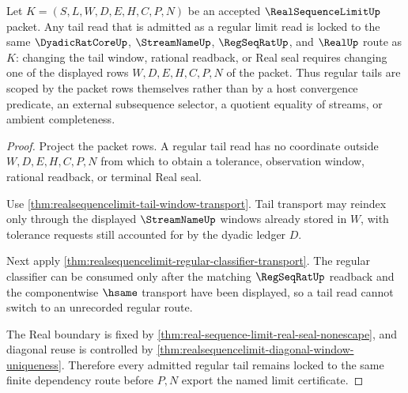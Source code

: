 \begin{theorem}\label{thm:realsequencelimit-regular-tail-scope-lock}
Let $K=(S,L,W,D,E,H,C,P,N)$ be an accepted $\RealSequenceLimitUp$ packet. Any tail read that is admitted as a regular limit read is locked to the same $\DyadicRatCoreUp$, $\StreamNameUp$, $\RegSeqRatUp$, and $\RealUp$ route as $K$: changing the tail window, rational readback, or Real seal requires changing one of the displayed rows $W,D,E,H,C,P,N$ of the packet. Thus regular tails are scoped by the packet rows themselves rather than by a host convergence predicate, an external subsequence selector, a quotient equality of streams, or ambient completeness.
\end{theorem}
\begin{proof}
Project the packet rows. A regular tail read has no coordinate outside $W,D,E,H,C,P,N$ from which to obtain a tolerance, observation window, rational readback, or terminal Real seal.

Use \autoref{thm:realsequencelimit-tail-window-transport}. Tail transport may reindex only through the displayed $\StreamNameUp$ windows already stored in $W$, with tolerance requests still accounted for by the dyadic ledger $D$.

Next apply \autoref{thm:realsequencelimit-regular-classifier-transport}. The regular classifier can be consumed only after the matching $\RegSeqRatUp$ readback and the componentwise $\hsame$ transport have been displayed, so a tail read cannot switch to an unrecorded regular route.

The Real boundary is fixed by \autoref{thm:real-sequence-limit-real-seal-nonescape}, and diagonal reuse is controlled by \autoref{thm:realsequencelimit-diagonal-window-uniqueness}. Therefore every admitted regular tail remains locked to the same finite dependency route before $P,N$ export the named limit certificate.
\end{proof}

